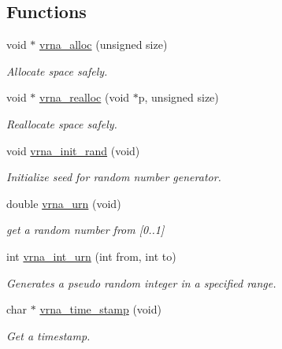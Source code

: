 \subsection*{Functions}
\begin{DoxyCompactItemize}
\item 
void $\ast$ \mbox{\hyperlink{group__utils_gaf37a0979367c977edfb9da6614eebe99}{vrna\+\_\+alloc}} (unsigned size)
\begin{DoxyCompactList}\small\item\em Allocate space safely. \end{DoxyCompactList}\item 
void $\ast$ \mbox{\hyperlink{group__utils_ga27f4719a66c6f90d1cca3d1e6e696c6a}{vrna\+\_\+realloc}} (void $\ast$p, unsigned size)
\begin{DoxyCompactList}\small\item\em Reallocate space safely. \end{DoxyCompactList}\item 
\mbox{\label{group__utils_ga0ad1f40ea316e5c5918695c35613027a}} 
void \mbox{\hyperlink{group__utils_ga0ad1f40ea316e5c5918695c35613027a}{vrna\+\_\+init\+\_\+rand}} (void)
\begin{DoxyCompactList}\small\item\em Initialize seed for random number generator. \end{DoxyCompactList}\item 
double \mbox{\hyperlink{group__utils_ga384e256ebb295d04a14426179db0dd6e}{vrna\+\_\+urn}} (void)
\begin{DoxyCompactList}\small\item\em get a random number from \mbox{[}0..1\mbox{]} \end{DoxyCompactList}\item 
int \mbox{\hyperlink{group__utils_ga46111bb3747dbcf4609f0d40ae169ad9}{vrna\+\_\+int\+\_\+urn}} (int from, int to)
\begin{DoxyCompactList}\small\item\em Generates a pseudo random integer in a specified range. \end{DoxyCompactList}\item 
char $\ast$ \mbox{\hyperlink{group__utils_gad3bbe8d01afb1310609cb018d5290550}{vrna\+\_\+time\+\_\+stamp}} (void)
\begin{DoxyCompactList}\small\item\em Get a timestamp. \end{DoxyCompactList}\item 

\end{DoxyCompactItemize}
